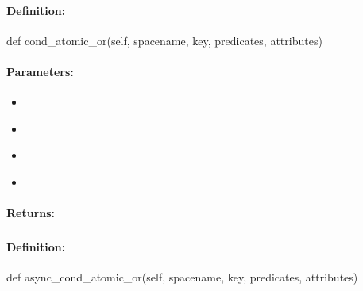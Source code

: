 \paragraph{Definition:}
\begin{pythoncode}
def cond_atomic_or(self, spacename, key, predicates, attributes)
\end{pythoncode}

\paragraph{Parameters:}
\begin{itemize}[noitemsep]
\item {}\\

\item {}\\

\item {}\\

\item {}\\

\end{itemize}

\paragraph{Returns:}


\pagebreak
\subsubsection{}
\label{api:python:async_cond_atomic_or}


\paragraph{Definition:}
\begin{pythoncode}
def async_cond_atomic_or(self, spacename, key, predicates, attributes)
\end{pythoncode}

